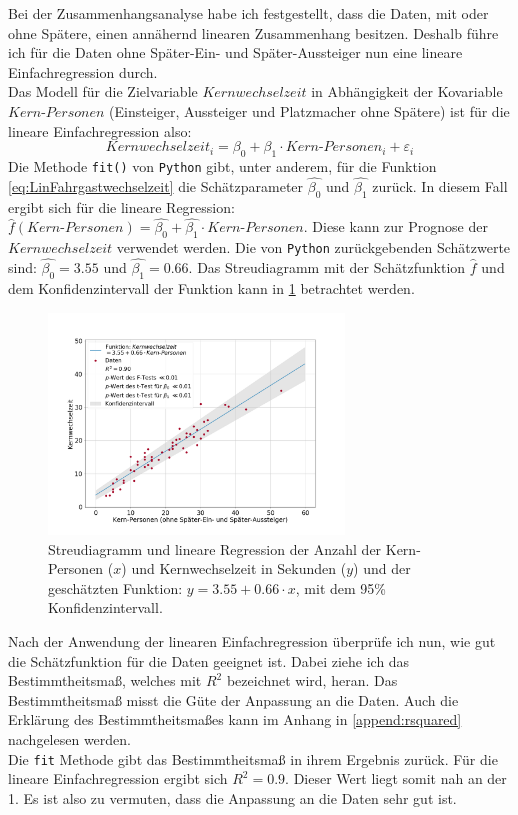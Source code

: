 Bei der Zusammenhangsanalyse habe ich festgestellt, dass die Daten, mit oder ohne Spätere, einen annähernd linearen Zusammenhang besitzen. Deshalb führe ich für die Daten ohne Später-Ein- und Später-Aussteiger nun eine lineare Einfachregression durch.\\
Das Modell für die Zielvariable $Kernwechselzeit$ in Abhängigkeit der Kovariable $Kern\text{-}Personen$ (Einsteiger, Aussteiger und Platzmacher ohne Spätere) ist für die lineare Einfachregression also:
\begin{equation}
Kernwechselzeit_i = \beta_0 + \beta_1 \cdot Kern\text{-}Personen_i + \varepsilon_i
\label{eq:LinFahrgastwechselzeit}
\end{equation} 
Die Methode \texttt{fit()} von \texttt{Python} gibt, unter anderem, für die Funktion \ref{eq:LinFahrgastwechselzeit} die Schätzparameter $\hat{\beta_0}$ und $\hat{\beta_1}$ zurück. In diesem Fall ergibt sich für die lineare Regression: $\hat{f}(Kern\text{-}Personen) = \hat{\beta_0} + \hat{\beta_1} \cdot Kern\text{-}Personen$. Diese kann zur Prognose der $Kernwechselzeit$ verwendet werden.
Die von \texttt{Python} zurückgebenden Schätzwerte sind: $\hat{\beta_0}=3.55$ und $\hat{\beta_1}=0.66$. Das Streudiagramm mit der Schätzfunktion $\hat{f}$ und dem Konfidenzintervall der Funktion kann in \figurename \ref{fig:LinReg} betrachtet werden.
\begin{figure}[H]
	\centering
		\includegraphics[width=0.7\textwidth]{pictures/data_evaluation/transferTime/lin_core_transfer_time.png}
	\caption{Streudiagramm und lineare Regression der Anzahl der Kern-Personen ($x$) und Kernwechselzeit in Sekunden ($y$) und der geschätzten Funktion: $y = 3.55 + 0.66 \cdot x$, mit dem 95\% Konfidenzintervall.}
	\label{fig:LinReg}
\end{figure}
Nach der Anwendung der linearen Einfachregression überprüfe ich nun, wie gut die Schätzfunktion für die Daten geeignet ist. Dabei ziehe ich das Bestimmtheitsmaß, welches mit $R^2$ bezeichnet wird, heran. Das Bestimmtheitsmaß misst die Güte der Anpassung an die Daten. Auch die Erklärung des Bestimmtheitsmaßes kann im Anhang in \ref{append:rsquared} nachgelesen werden. \\
Die \texttt{fit} Methode gibt das Bestimmtheitsmaß in ihrem Ergebnis zurück. Für die lineare Einfachregression ergibt sich $R^2=0.9$. Dieser Wert liegt somit nah an der 1. Es ist also zu vermuten, dass die Anpassung an die Daten sehr gut ist. 

